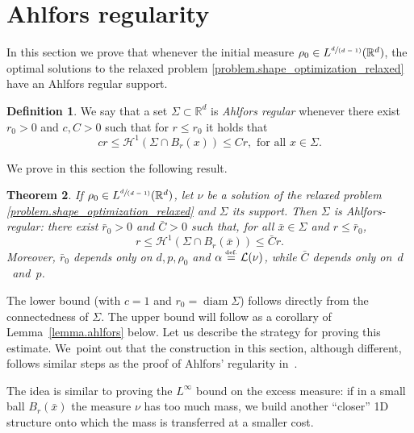 \documentclass[JEP,XML,SOM,Unicode,NoFloatCountersInSection,published]{cedram}
\newcommand{\spfrac}[2]{\sfrac{#1}{(#2)}}
\newtheorem{theorem}{Theorem}[section]
\theoremstyle{definition}
\newtheorem{definition}[theorem]{Definition}
\newcommand{\eqdef}{\ensuremath{\stackrel{\mbox{\upshape\tiny def.}}{=}}}
\newcommand\cH{\mathcal{H}}
\newcommand{\RR}{\mathbb{R}}
\DeclareMathOperator{\diam}{diam}
\begin{document}
\section{Ahlfors regularity}\label{section.ahlfors_regularity}
In this section we prove that whenever the initial measure $\rho_0 \in L^{\spfrac{d}{d-1}}(\RR^d)$, the optimal solutions to the relaxed problem \eqref{problem.shape_optimization_relaxed} have an Ahlfors regular support.

\begin{definition}\label{definition.alhfords_regularity}
We say that a set $\Sigma \subset \RR^d$ is \emph{Ahlfors regular} whenever there exist $r_0>0$ and $c,C>0$ such that for $r \le r_0$ it holds that
\[
cr \le \cH^1(\Sigma \cap B_r(x)) \le Cr, \text{ for all $x \in \Sigma$.}
\]
\end{definition}

We prove in this section the following result.
\begin{theorem}\label{th:ahlfors}
If $\rho_0\in L^{\spfrac{d}{d-1}}(\RR^d)$, let $\nu$ be a solution of the relaxed problem \eqref{problem.shape_optimization_relaxed} and $\Sigma$ its support. Then $\Sigma$ is Ahlfors-regular: there exist $\bar r_0>0$ and $\bar C>0$ such that, for all $\bar x \in \Sigma$ and $r \le \bar r_0$,
\[
r \le \cH^1(\Sigma \cap B_r(\bar x)) \le \bar C r.
\]
Moreover, $\bar r_0$ depends only on $d,p,\rho_0$ and $\alpha \eqdef \mathcal{L}(\nu)$, while $\bar C$ depends only on~$d$~and~$p$.
\end{theorem}
The lower bound (with $c=1$ and $r_0=\diam\Sigma$) follows directly from the connectedness of $\Sigma$. The upper bound will follow as a corollary of
Lemma~\ref{lemma.ahlfors} below. Let us describe the strategy for proving this estimate. We~point out that the construction in this section,
although different, follows similar steps as
the proof of Ahlfors' regularity in~\cite[Lem.\,6.1, Th.\,6.4]{paolini2004qualitative}.

The idea is similar to
proving the $L^\infty$ bound on the excess measure: if in a small ball
$B_r(\bar x)$ the measure $\nu$ has too much mass,
we build another ``closer'' 1D structure onto which the mass is transferred at a smaller cost.
\end{document}
